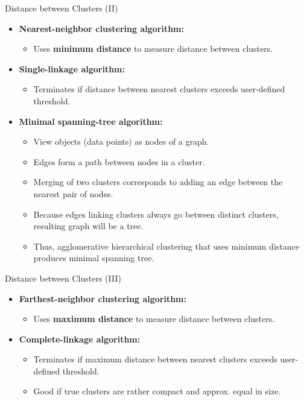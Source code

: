 \begin{frame}{Distance between Clusters (II)}
  \begin{itemize}
  \item \textbf{Nearest-neighbor clustering algorithm:}
    \begin{itemize}
    \item Uses \textbf{\color{airforceblue}minimum distance} to measure
      distance between clusters.
    \end{itemize}
  \item \textbf{Single-linkage algorithm:}
    \begin{itemize}
    \item Terminates if distance between nearest clusters exceeds
      user-defined threshold.
    \end{itemize}
  \item \textbf{Minimal spanning-tree algorithm:}
    \begin{itemize}
    \item View objects (data points) as nodes of a graph.
    \item Edges form a path between nodes in a cluster.
    \item Merging of two clusters corresponds to adding an edge between
      the nearest pair of nodes.
    \item Because edges linking clusters always go between distinct
      clusters,\\
      resulting graph will be a tree.
    \item Thus, agglomerative hierarchical clustering that uses minimum
      distance produces minimal spanning tree.
    \end{itemize}
  \end{itemize}
\end{frame}

\begin{frame}{Distance between Clusters (III)}
  \begin{itemize}
  \item \textbf{Farthest-neighbor clustering algorithm:}
    \begin{itemize}
    \item Uses \textbf{\color{airforceblue}maximum distance} to measure
      distance between clusters.
    \end{itemize}
  \item \textbf{Complete-linkage algorithm:}
    \begin{itemize}
    \item Terminates if maximum distance between nearest clusters
      exceeds user-defined threshold.
    \item Good if true clusters are rather compact and approx. equal in
      size.
    \end{itemize}
  \end{itemize}
\end{frame}

